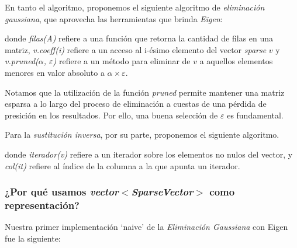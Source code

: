 \vspace{1em}
En tanto el algoritmo, proponemos el siguiente algoritmo de \textit{eliminación gaussiana}, que aprovecha las herramientas que brinda \textit{Eigen}:

\vspace{1em}


\vspace{1em}
\noindent donde \textit{filas(A)} refiere a una función que retorna la cantidad de filas en una matriz, \textit{v.coeff(i)} refiere a un acceso al i-ésimo elemento del vector \textit{sparse} $v$ y \textit{v.pruned($\alpha$, $\varepsilon$)} refiere a un método para eliminar de $v$ a aquellos elementos menores en valor absoluto a $\alpha \times \varepsilon$.

\vspace{1em}
Notamos que la utilización de la función \textit{pruned} permite mantener una matriz esparsa a lo largo del proceso de eliminación a cuestas de una pérdida de presición en los resultados. Por ello, una buena selección de $\varepsilon$ es fundamental. 

\vspace{1em}
\noindent Para la \textit{sustitución inversa}, por su parte, proponemos el siguiente algoritmo.

\vspace{1em}


\vspace{1em}
\noindent donde \textit{iterador(v)} refiere a un iterador sobre los elementos no nulos del vector, y \textit{col(it)} refiere al índice de la columna a la que apunta un iterador.




\vspace{2em}
\subsubsection{¿Por qué usamos \textit{vector$<$SparseVector$>$} como representación?}\label{representacion}

\vspace{1em}
Nuestra primer implementación `naive' de la \textit{Eliminación Gaussiana} con Eigen fue la siguiente:

\vspace{1em}


